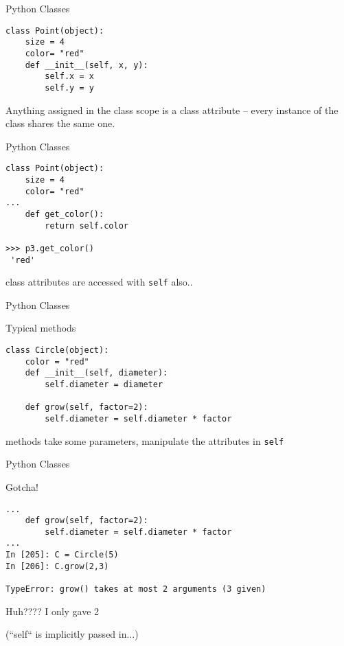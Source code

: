 \documentclass{beamer}
\begin{document}
\begin{frame}[fragile]{Python Classes}

\begin{verbatim}
class Point(object):
    size = 4
    color= "red"
    def __init__(self, x, y):
        self.x = x
        self.y = y
\end{verbatim}

\vfill
{\Large Anything assigned in the class scope is a class attribute -- every
instance of the class shares the same one.}
\vfill
\end{frame} 

\begin{frame}[fragile]{Python Classes}

\begin{verbatim}
class Point(object):
    size = 4
    color= "red"
...
    def get_color():
        return self.color

>>> p3.get_color()
 'red'
\end{verbatim}

\vfill
{\Large class attributes are accessed with \verb|self| also..} 
\vfill
\end{frame} 


\begin{frame}[fragile]{Python Classes}

{\Large Typical methods}
\begin{verbatim}
class Circle(object):
    color = "red"
    def __init__(self, diameter):
        self.diameter = diameter

    def grow(self, factor=2):
        self.diameter = self.diameter * factor
\end{verbatim}

\vfill
{\Large methods take some parameters, manipulate the attributes in \verb|self|} 

\end{frame} 

\begin{frame}[fragile]{Python Classes}

{\Large Gotcha!}
\begin{verbatim}
...
    def grow(self, factor=2):
        self.diameter = self.diameter * factor
...
In [205]: C = Circle(5)
In [206]: C.grow(2,3)

TypeError: grow() takes at most 2 arguments (3 given)
\end{verbatim}

\vfill
{\LARGE Huh???? I only gave 2} 

\vfill
{\Large (``self`` is implicitly passed in...)}
\end{frame} 
\end{document}
